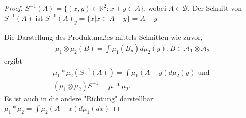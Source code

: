 \documentclass[]{article}
\begin{document}
\begin{proof}
	$S^{-1}(A) = \{(x,y)\in \mathbb{R}^2: x+y\in A\}$, wobei $A \in \mathcal{B}$. Der Schnitt von $S^{-1}(A)$ ist $S^{-1}(A)_y = \{x|x\in A-y\} = A-y$
	
	Die Darstellung des Produktmaßes mittels Schnitten wie zuvor,
	\begin{align*}
		\mu_1\otimes\mu_2(B) = \int \mu_1(B_y) d\mu_2(y), B \in \mathcal{A}_1 \otimes \mathcal{A}_2
	\end{align*}
	ergibt
	\begin{align*}
		\mu_1 * \mu_2(S^{-1}(A)) = \int \mu_1(A-y) d\mu_2(y) \text{ und }\\
		(\mu_1\otimes\mu_2)S^{-1} = \mu_1 * \mu_2.
	\end{align*}
	Es ist auch in die andere "Richtung" darstellbar: $\mu_1 * \mu_2 = \int \mu_2(A-x) d\mu_1(dx)$
\end{proof}
\end{document}
